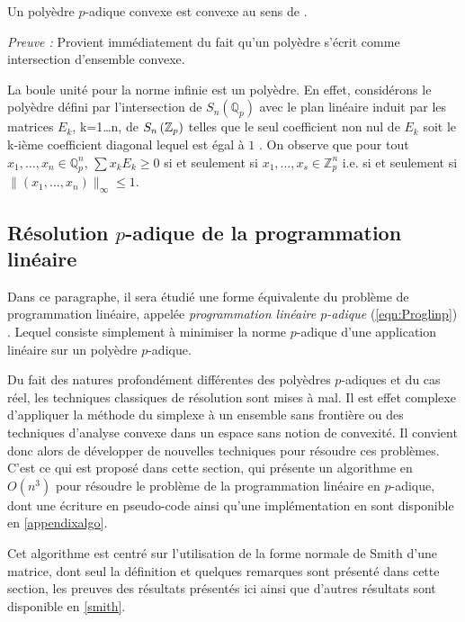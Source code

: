 \begin{propriete}
Un polyèdre $p$-adique convexe est convexe au sens de \cite{monna_ensembles_1958}.  
\end{propriete}

\textit{Preuve :} Provient immédiatement du fait qu'un polyèdre s'écrit comme intersection d'ensemble convexe.

\begin{ex}
	La boule unité pour la norme infinie est un polyèdre. En effet, considérons le polyèdre défini par l'intersection de $S_n\left( \mathbb{Q}_{ p }  \right) $ avec le plan linéaire induit par les matrices $E_k$, k=1\ldots n, de $S_n\left(  \mathbb {Z}_p  \right) $ telles que le seul coefficient non nul de $E_k$ soit le k-ième coefficient diagonal lequel est égal à $1$ . On observe que pour tout $x_1,\ldots,x_n \in \mathbb{Q}_{ p } ^n$, $\sum x_k E_k \ge 0$ si et seulement si $x_1,\ldots,x_s \in \mathbb{Z}_{ p }^n $ i.e. si et seulement si $\|(x_1,\ldots,x_n)\|_\infty \le 1$. 

\end{ex}

\subsection{Résolution \texorpdfstring{$p$}{p}-adique de la programmation linéaire}
\label{sectionalgo} 
Dans ce paragraphe, il sera étudié une forme équivalente du problème de programmation linéaire, appelée \textit{programmation linéaire $p$-adique} (\ref{eqn:Proglinp}) . Lequel consiste simplement à minimiser la norme $p$-adique d'une application linéaire sur un polyèdre $p$-adique. 

	Du fait des natures profondément différentes des polyèdres $p$-adiques et du cas réel, les techniques classiques de résolution sont mises à mal. Il est effet complexe d'appliquer la méthode du simplexe à un ensemble sans frontière ou des techniques d'analyse convexe dans un espace sans notion de convexité. Il convient donc alors de développer de nouvelles techniques pour résoudre ces problèmes. C'est ce qui est proposé dans cette section, qui présente un algorithme en $O(n^3)$  pour résoudre le problème de la programmation linéaire en $p$-adique, dont une écriture en pseudo-code ainsi qu'une implémentation en \sage sont disponible en \ref{appendixalgo}.

	Cet algorithme est centré sur l'utilisation de la forme normale de Smith d'une matrice, dont seul la définition et quelques remarques sont présenté dans cette section, les preuves des résultats présentés ici ainsi que d'autres résultats sont disponible en \ref{smith}.

